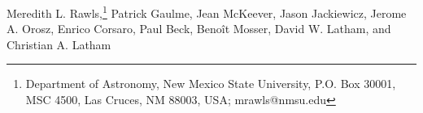 

Meredith L. Rawls,\footnote{Department of Astronomy, New Mexico State University, P.O. Box 30001, MSC 4500, Las Cruces, NM 88003, USA; mrawls@nmsu.edu}
Patrick Gaulme,%
Jean McKeever,%
Jason Jackiewicz,%
Jerome A. Orosz,%
Enrico Corsaro,%
Paul Beck,%
Beno\^it Mosser,%
David W. Latham,%
and 
Christian A. Latham%

